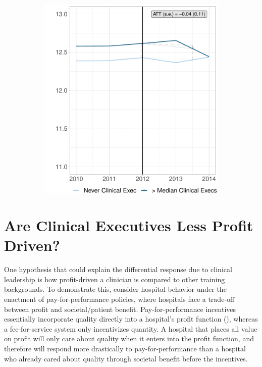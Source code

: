 \documentclass[12pt]{article}
\begin{document}
\begin{figure}[ht!]
\begin{subfigure}[b]{0.45\textwidth}
         \includegraphics[width=\textwidth]{Objects/cont_abovemedmort_md_nomd_synth_graph.pdf}
         \label{fig:abovemed_mort_synth_clinical}
     \end{subfigure}
        \label{fig:cont_clinicalsynthdid_mort}
    \end{figure}


    \section{Are Clinical Executives Less Profit Driven?}\label{sec:forprofit}

    One hypothesis that could explain the differential response due to clinical leadership is how profit-driven a clinician is compared to other training backgrounds. To demonstrate this, consider hospital behavior under the enactment of pay-for-performance policies, where hospitals face a trade-off between profit and societal/patient benefit. Pay-for-performance incentives essentially incorporate quality directly into a hospital's profit function (\cite{dranove2011health}), whereas a fee-for-service system only incentivizes quantity. A hospital that places all value on profit will only care about quality when it enters into the profit function, and therefore will respond more drastically to pay-for-performance than a hospital who already cared about quality through societal benefit before the incentives.
\end{document}
